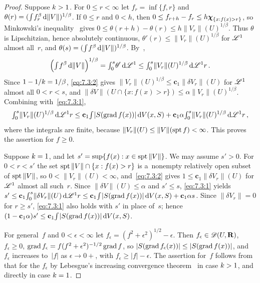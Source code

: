 \begin{proof}
    Suppose $k > 1$. For $0 \le r < \infty$ let $f_r = \inf \{ f, r \}$ and $\theta(r) =
    ({\textstyle\int_{}^{}} f_r^\beta \,\mathrm{d} \|V\|)^{1/\beta}$. If $0 \le r$ and $0 < h$, then $0 \le f_{r+h} -
    f_r \le h \boldsymbol{\chi}_{\{ x : f(x) > r \}}$, so Minkowski's inequality~\cite[2.4.15]{Federer1969} gives
    $0 \le \theta(r+h) - \theta(r) \le h \|V_r\|(U)^{1/\beta}$. Thus $\theta$ is Lipschitzian, hence
    absolutely continuous, $\theta'(r) \le \|V_r\|(U)^{1/\beta}$ for $\mathscr{L}^1$ almost all~$r$, and
    $\theta(s) = ({\textstyle\int_{}^{}} f^\beta \,\mathrm{d} \|V\|)^{1/\beta}$. By~\cite[2.9.20]{Federer1969},
    \begin{displaymath}
        \Big( {\textstyle\int_{}^{}} f^\beta \,\mathrm{d} \|V\| \Big)^{1/\beta} = {\textstyle\int_{0}^{s}} \theta' \,\mathrm{d} \mathscr{L}^1 \le
        {\textstyle\int_{0}^{s}} \|V_r\|(U)^{1/\beta} \,\mathrm{d} \mathscr{L}^1 r \,.
    \end{displaymath}
    Since $1 - 1/k = 1/\beta$, \eqref{eq:7.3:2} gives $\|V_r\|(U)^{1/\beta} \le \mathbf{c}_1
    \|\delta V_r\|(U)$ for $\mathscr{L}^1$ almost all $0 < r < s$, and $\|\delta V\|(U \cap \{ x : f(x) > r
    \}) \le \alpha \|V_r\|(U)^{1/\beta}$. Combining with~\eqref{eq:7.3:1},
    \begin{displaymath}
        {\textstyle\int_{0}^{s}} \|V_r\|(U)^{1/\beta} \,\mathrm{d} \mathscr{L}^1 r \le \mathbf{c}_1 {\textstyle\int_{}^{}} |S(\operatorname{grad}
        f(x))| \,\mathrm{d} V(x,S) + \mathbf{c}_1 \alpha {\textstyle\int_{0}^{s}} \|V_r\|(U)^{1/\beta} \,\mathrm{d} \mathscr{L}^1 r \,,
    \end{displaymath}
    where the integrals are finite, because $\|V_r\|(U) \le \|V\|(\operatorname{spt} f) < \infty$. This proves the
    assertion for $f \ge 0$.

    Suppose $k = 1$, and let $s' = \sup \{ f(x) : x \in \operatorname{spt} \|V\| \}$. We may assume $s' > 0$.
    For $0 < r < s'$ the set $\operatorname{spt} \|V\| \cap \{ x : f(x) > r \}$ is a~nonempty relatively open
    subset of $\operatorname{spt} \|V\|$, so $0 < \|V_r\|(U) < \infty$, and~\eqref{eq:7.3:2} gives $1 \le
    \mathbf{c}_1 \|\delta V_r\|(U)$ for $\mathscr{L}^1$ almost all such~$r$. Since $\|\delta V\|(U) \le
    \alpha$ and $s' \le s$, \eqref{eq:7.3:1} yields $s' \le \mathbf{c}_1 {\textstyle\int_{0}^{s}} \|\delta
    V_r\|(U) \,\mathrm{d} \mathscr{L}^1 r \le \mathbf{c}_1 {\textstyle\int_{}^{}} |S(\operatorname{grad} f(x))| \,\mathrm{d} V(x,S) + \mathbf{c}_1
    \alpha s$. Since $\|\delta V_r\| = 0$ for $r \ge s'$, \eqref{eq:7.3:1} also holds with $s'$ in
    place of~$s$; hence $(1 - \mathbf{c}_1 \alpha) s' \le \mathbf{c}_1 {\textstyle\int_{}^{}} |S(\operatorname{grad} f(x))|
    \,\mathrm{d} V(x,S)$.

    For general~$f$ and $0 < \epsilon < \infty$ let $f_\epsilon = (f^2 + \epsilon^2)^{1/2} -
    \epsilon$. Then $f_\epsilon \in \mathscr{D}(U,\mathbf{R})$, $f_\epsilon \ge 0$, $\operatorname{grad} f_\epsilon = f (f^2 +
    \epsilon^2)^{-1/2} \operatorname{grad} f$, so $|S(\operatorname{grad} f_\epsilon(x))| \le |S(\operatorname{grad} f(x))|$, and $f_\epsilon$
    increases to~$|f|$ as $\epsilon \to 0+$, with $f_\epsilon \ge |f| - \epsilon$. The assertion
    for~$f$ follows from that for the $f_\epsilon$ by Lebesgue's increasing convergence
    theorem~\cite[2.4.7]{Federer1969} in case $k > 1$, and directly in case $k = 1$.
\end{proof}

